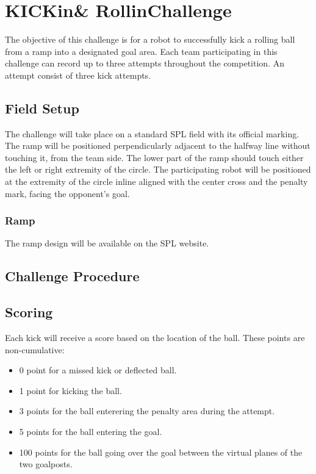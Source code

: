 \section{KICKin\textquotesingle \& Rollin\textquotesingle Challenge}

The objective of this challenge is for a robot to successfully kick a rolling ball from a ramp into a designated goal area. 
Each team participating in this challenge can record up to three attempts throughout the competition.
An attempt consist of three kick attempts. 

\subsection{Field Setup}

The challenge will take place on a standard SPL field with its official marking. 
The ramp will be positioned perpendicularly adjacent to the halfway line without touching it, from the team side. 
The lower part of the ramp should touch either the left or right extremity of the circle.
The participating robot will be positioned at the extremity of the circle inline aligned with the center cross and the penalty mark, facing the opponent's goal.

\subsubsection{Ramp}

The ramp design will be available on the SPL website. 

\subsection{Challenge Procedure}

\subsection{Scoring}

Each kick will receive a score based on the location of the ball.
These points are non-cumulative: 

\begin{itemize}
	\item 0 point for a missed kick or deflected ball.
	\item 1 point for kicking the ball.
	\item 3 points for the ball enterering the penalty area during the attempt.
	\item 5 points for the ball entering the goal. 
	\item 100 points for the ball going over the goal between the virtual planes of the two goalposts. 
  \end{itemize}